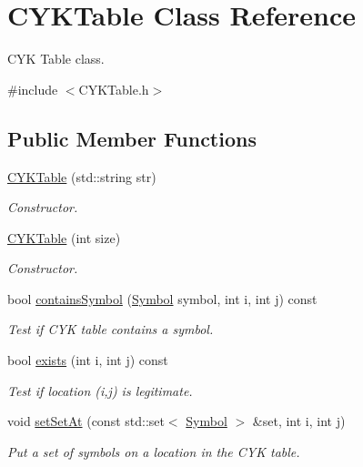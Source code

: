 \hypertarget{class_c_y_k_table}{\section{\-C\-Y\-K\-Table \-Class \-Reference}
\label{class_c_y_k_table}
}


\-C\-Y\-K \-Table class.  




{\ttfamily \#include $<$\-C\-Y\-K\-Table.\-h$>$}

\subsection*{\-Public \-Member \-Functions}
\begin{DoxyCompactItemize}
\item 
\hyperlink{class_c_y_k_table_a8e7e24af9e6c9a58bb64511a747c50df}{\-C\-Y\-K\-Table} (std\-::string str)
\begin{DoxyCompactList}\small\item\em \-Constructor. \end{DoxyCompactList}\item 
\hyperlink{class_c_y_k_table_a550000fc8ce9f0166fb1051ea44609cf}{\-C\-Y\-K\-Table} (int size)
\begin{DoxyCompactList}\small\item\em \-Constructor. \end{DoxyCompactList}\item 
bool \hyperlink{class_c_y_k_table_a52e9ac797350ce2af9a0bc1b0bf320b1}{contains\-Symbol} (\hyperlink{class_symbol}{\-Symbol} symbol, int i, int j) const 
\begin{DoxyCompactList}\small\item\em \-Test if \-C\-Y\-K table contains a symbol. \end{DoxyCompactList}\item 
bool \hyperlink{class_c_y_k_table_ac241993a108769be18ef2e69a222a134}{exists} (int i, int j) const 
\begin{DoxyCompactList}\small\item\em \-Test if location (i,j) is legitimate. \end{DoxyCompactList}\item 
void \hyperlink{class_c_y_k_table_ac8bb7890d209871fa7d5b422187139e8}{set\-Set\-At} (const std\-::set$<$ \hyperlink{class_symbol}{\-Symbol} $>$ \&set, int i, int j)
\begin{DoxyCompactList}\small\item\em \-Put a set of symbols on a location in the \-C\-Y\-K table. \end{DoxyCompactList}\item 

\end{DoxyCompactItemize}
